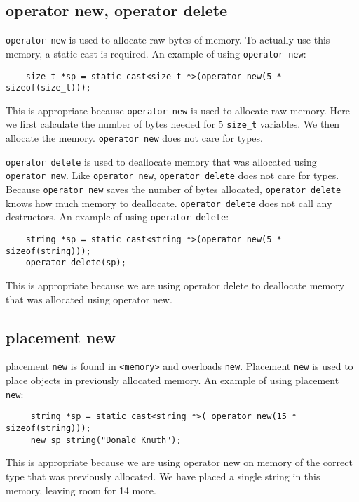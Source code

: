 \subsection*{operator new, operator delete}
\texttt{operator new} is used to allocate raw bytes of memory. To actually use this memory, a static cast is required. An example of using \texttt{operator new}:
    \begin{verbatim}
    size_t *sp = static_cast<size_t *>(operator new(5 * sizeof(size_t)));
    \end{verbatim}
    This is appropriate because \texttt{operator new} is used to allocate raw memory.
    Here we first calculate the number of bytes needed for 5 \texttt{size\_t} variables. We then allocate the memory. \texttt{operator new} does not care for types.
        
    \texttt{operator delete} is used to deallocate memory that was allocated using \texttt{operator new}. Like \texttt{operator new}, \texttt{operator delete} does not care for types. Because \texttt{operator new} saves the number of bytes allocated, \texttt{operator delete} knows how much memory to deallocate. \texttt{operator delete} does not call any destructors. An example of using \texttt{operator delete}:
    \begin{verbatim}
    string *sp = static_cast<string *>(operator new(5 * sizeof(string)));
    operator delete(sp);
    \end{verbatim}
   This is appropriate because we are using operator delete to deallocate memory that was allocated using operator new.

\subsection*{placement new}
placement \texttt{new} is found in \texttt{<memory>} and overloads \texttt{new}.  Placement \texttt{new} is used to place objects in previously allocated memory.
An example of using placement \texttt{new}:
    \begin{verbatim}
     string *sp = static_cast<string *>( operator new(15 * sizeof(string)));
     new sp string("Donald Knuth");
    \end{verbatim}
This is appropriate because we are using operator new on memory of the correct type that was previously allocated. 
We have placed a single string in this memory, leaving room for 14 more.
